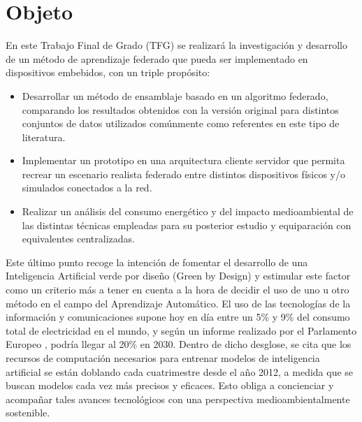 \documentclass[00-Trabajo_Final.tex]{subfiles}
\begin{document}
\makeatletter
\renewcommand\listoftables{%
        \@starttoc{lot}%
}
\makeatother
\makeatletter
\renewcommand\listoffigures {%
        \@starttoc{lof}%
}
\makeatother
\renewcommand{\NombreDocumento}{Memoria}

\renewcommand{\contentsname}{Índice \NombreDocumento}
\newpage

\section{Objeto}

En este Trabajo Final de Grado (TFG) se realizará la investigación y desarrollo de un método de aprendizaje federado que pueda ser implementado en dispositivos embebidos, con un triple propósito:

\begin{itemize}[noitemsep]
    \item Desarrollar un método de ensamblaje basado en un algoritmo federado, comparando los resultados obtenidos con la versión original para distintos conjuntos de datos utilizados comúnmente como referentes en este tipo de literatura.
    \item Implementar un prototipo en una arquitectura cliente servidor que permita recrear un escenario realista federado entre distintos dispositivos físicos y/o simulados conectados a la red.
    \item Realizar un análisis del consumo energético y del impacto medioambiental de las distintas técnicas empleadas para su posterior estudio  y equiparación con equivalentes centralizadas.
\end{itemize}

\vspace{0.5em}

Este último punto recoge la intención de fomentar el desarrollo de una Inteligencia Artificial verde por diseño (Green by Design) y estimular este factor como un criterio más a tener en cuenta a la hora de decidir el uso de uno u otro método en el campo del Aprendizaje Automático. El uso de las tecnologías de la información y comunicaciones supone hoy en día entre un 5\% y 9\% del consumo total de electricidad en el mundo, y según un informe realizado por el Parlamento Europeo \cite{libro_roleAI}, podría llegar al 20\% en 2030. Dentro de dicho desglose, se cita que los recursos de computación necesarios para entrenar modelos de inteligencia artificial se están doblando cada cuatrimestre desde el año 2012, a medida que se buscan modelos cada vez más precisos y eficaces. Esto obliga a concienciar y acompañar tales avances tecnológicos con una perspectiva medioambientalmente sostenible.
\end{document}
